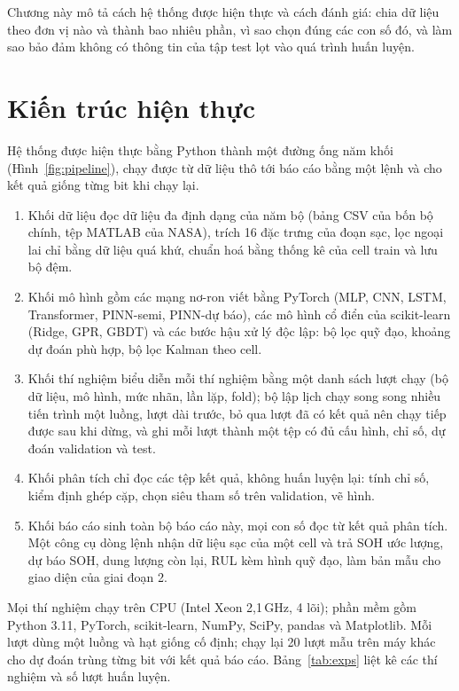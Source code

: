 \documentclass[12pt,a4paper,oneside]{report}
\theoremstyle{plain}
\theoremstyle{definition}
\begin{document}
Chương này mô tả cách hệ thống được hiện thực và cách đánh giá: chia dữ liệu theo đơn vị nào và thành bao nhiêu
phần, vì sao chọn đúng các con số đó, và làm sao bảo đảm không có thông tin của tập test lọt vào quá trình huấn
luyện.

\section{Kiến trúc hiện thực}\label{sec:impl}

Hệ thống được hiện thực bằng Python thành một đường ống năm khối (Hình~\ref{fig:pipeline}), chạy được từ dữ liệu thô
tới báo cáo bằng một lệnh và cho kết quả giống từng bit khi chạy lại.

\begin{enumerate}
\item Khối dữ liệu đọc dữ liệu đa định dạng của năm bộ (bảng CSV của bốn bộ chính, tệp MATLAB của NASA), trích 16 đặc
      trưng của đoạn sạc, lọc ngoại lai chỉ bằng dữ liệu quá khứ, chuẩn hoá bằng thống kê của cell train và lưu bộ đệm.
\item Khối mô hình gồm các mạng nơ-ron viết bằng PyTorch (MLP, CNN, LSTM, Transformer, PINN-semi, PINN-dự báo), các
      mô hình cổ điển của scikit-learn (Ridge, GPR, GBDT) và các bước hậu xử lý độc lập: bộ lọc quỹ đạo, khoảng dự đoán
      phù hợp, bộ lọc Kalman theo cell.
\item Khối thí nghiệm biểu diễn mỗi thí nghiệm bằng một danh sách lượt chạy (bộ dữ liệu, mô hình, mức nhãn, lần lặp,
      fold); bộ lập lịch chạy song song nhiều tiến trình một luồng, lượt dài trước, bỏ qua lượt đã có kết quả nên
      chạy tiếp được sau khi dừng, và ghi mỗi lượt thành một tệp có đủ cấu hình, chỉ số, dự đoán validation và test.
\item Khối phân tích chỉ đọc các tệp kết quả, không huấn luyện lại: tính chỉ số, kiểm định ghép cặp, chọn siêu tham số
      trên validation, vẽ hình.
\item Khối báo cáo sinh toàn bộ báo cáo này, mọi con số đọc từ kết quả phân tích. Một công cụ dòng lệnh nhận dữ liệu
      sạc của một cell và trả SOH ước lượng, dự báo SOH, dung lượng còn lại, RUL kèm hình quỹ đạo, làm bản mẫu cho giao
      diện của giai đoạn 2.
\end{enumerate}

Mọi thí nghiệm chạy trên CPU (Intel Xeon 2,1\,GHz, 4 lõi); phần mềm gồm Python 3.11, PyTorch, scikit-learn, NumPy,
SciPy, pandas và Matplotlib. Mỗi lượt dùng một luồng và hạt giống cố định; chạy lại 20 lượt mẫu trên máy khác cho dự
đoán trùng từng bit với kết quả báo cáo. Bảng~\ref{tab:exps} liệt kê các thí nghiệm và số lượt huấn luyện.
\end{document}
